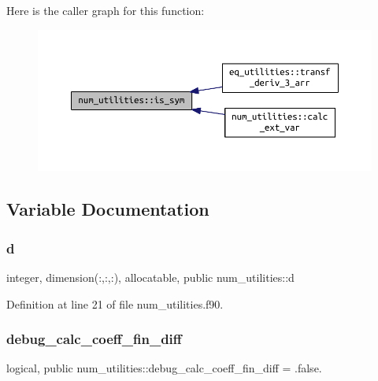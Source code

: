Here is the caller graph for this function\+:
\nopagebreak
\begin{figure}[H]
\begin{center}
\leavevmode
\includegraphics[width=350pt]{namespacenum__utilities_a4e6994b5c92b3d16c8538b54db0beadd_icgraph}
\end{center}
\end{figure}


\subsection{Variable Documentation}
\mbox{\label{namespacenum__utilities_a763215553acfcc054b1ec1bc207a1793}} 
\subsubsection{\texorpdfstring{d}{d}}
{\footnotesize\ttfamily integer, dimension(\+:,\+:,\+:), allocatable, public num\+\_\+utilities\+::d}



Definition at line 21 of file num\+\_\+utilities.\+f90.

\mbox{\label{namespacenum__utilities_ae20985c8049d39f987fa23d728688cbc}} 
\subsubsection{\texorpdfstring{debug\+\_\+calc\+\_\+coeff\+\_\+fin\+\_\+diff}{debug\_calc\_coeff\_fin\_diff}}
{\footnotesize\ttfamily logical, public num\+\_\+utilities\+::debug\+\_\+calc\+\_\+coeff\+\_\+fin\+\_\+diff = .false.}



